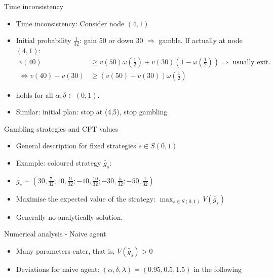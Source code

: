\begin{frame}{Time inconsistency}
    \begin{itemize}
        \item Time inconsistency: Consider node $(4,1)$\medskip
        \item Initial probability $\frac{1}{32}$: gain 50 or down 30  $\Rightarrow$ gamble.  If actually at node $(4,1)$:
        \begin{align*}v(40) &\geq v(50)\omega \left(\frac{1}{2}\right)+v(30)\left(1-\omega \left(\frac{1}{2}\right)\right) \Rightarrow \text{ usually exit.}\\
        \Leftrightarrow v(40)-v(30) &\geq (v(50)-v(30))\omega \left(\frac{1}{2}\right)\end{align*}
        \item  holds for all $\alpha, \delta \in (0,1)$.\medskip
        \item Similar: initial plan: stop at (4,5), stop gambling\medskip
    \end{itemize}
\end{frame}


\begin{frame}{Gambling strategies and CPT values}
    \begin{itemize}
        \item General description for fixed strategies $s \in S(0,1)$\bigskip
        \item Example: coloured strategy $\tilde{g_s}$:\bigskip
        \item $\tilde{g_s} \backsim \left(30,\frac{7}{32}; 10,\frac{9}{32}; -10, \frac{10}{32}; -30,\frac{5}{32};-50,\frac{1}{32} \right)  $\bigskip
        \item Maximise the expected value of the strategy: $\max_{s \in S(0,1)} V(\tilde{g_s})$\bigskip
        \item Generally no analytically solution.\bigskip
    \end{itemize}
\end{frame}

\begin{frame}{Numerical analysis - Naive agent}
    \begin{itemize}
        \item Many parameters enter, that is, $V(\tilde{g_s})>0 $\medskip
        \item Deviations for naive agent: $(\alpha,\delta,\lambda)=(0.95,0.5,1.5)$ in the following\medskip
    \end{itemize}
\end{frame}

